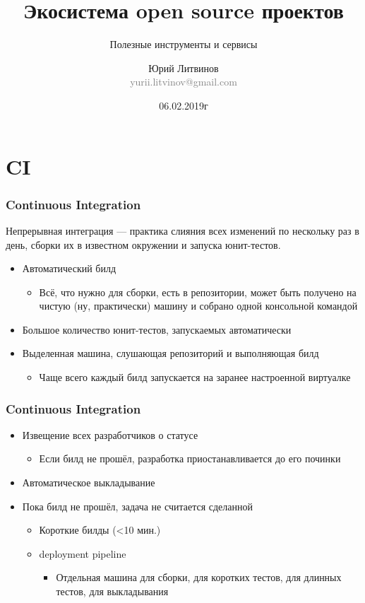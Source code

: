 \documentclass[xetex,mathserif,serif]{beamer}
\title{Экосистема open source проектов}
\subtitle{Полезные инструменты и сервисы}
\author[Юрий Литвинов]{Юрий Литвинов\\\small{\textcolor{gray}{yurii.litvinov@gmail.com}}}
\date{06.02.2019г}
\begin{document}
	\frame{\titlepage}

	\section{CI}

	\begin{frame}
		\frametitle{Continuous Integration}
		Непрерывная интеграция --- практика слияния всех изменений по нескольку раз в день, сборки их в известном окружении и запуска юнит-тестов.
		\begin{itemize}
			\item Автоматический билд
			\begin{itemize}
				\item Всё, что нужно для сборки, есть в репозитории, может быть получено на чистую (ну, практически) машину и собрано одной консольной командой
			\end{itemize}
			\item Большое количество юнит-тестов, запускаемых автоматически
			\item Выделенная машина, слушающая репозиторий и выполняющая билд
			\begin{itemize}
				\item Чаще всего каждый билд запускается на заранее настроенной виртуалке
			\end{itemize}
		\end{itemize}
	\end{frame}

	\begin{frame}
		\frametitle{Continuous Integration}
		\begin{itemize}
			\item Извещение всех разработчиков о статусе
			\begin{itemize}
				\item Если билд не прошёл, разработка приостанавливается до его починки
			\end{itemize}
			\item Автоматическое выкладывание
			\item Пока билд не прошёл, задача не считается сделанной
			\begin{itemize}
				\item Короткие билды (<10 мин.)
				\item deployment pipeline
				\begin{itemize}
					\item Отдельная машина для сборки, для коротких тестов, для длинных тестов, для выкладывания
				\end{itemize}
			\end{itemize}
		\end{itemize}
	\end{frame}
\end{document}
